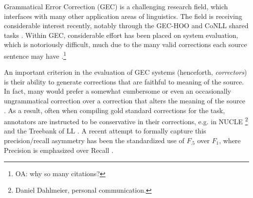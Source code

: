 \documentclass[letter,11pt]{article}
\newcommand{\oa}[1]{\footnote{\color{red}OA: #1}}
\newcommand{\lc}[1]{\footnote{\color{green}LC: #1}}
\begin{document}



Grammatical Error Correction (GEC) is a challenging research field, which interfaces with many
other application areas of linguistics. The field is receiving considerable
interest recently, notably through the GEC-HOO \cite{dale2011helping,dale2012hoo} and
CoNLL shared tasks \cite{kao2013conll,ng2014conll}.
Within GEC, considerable effort has been placed on system evaluation,
which is notoriously difficult,
much due to the many valid corrections each source sentence may have
\cite{tetreault2008native,madnani2011they,chodorow2012problems,dahlmeier2012better}.\oa{why so many citations?}

An important criterion in the evaluation of GEC systems (henceforth, {\it correctors})
is their ability to generate corrections that are faithful to meaning of the source. In fact, many would prefer
a somewhat cumbersome or even an occasionally ungrammatical correction over a correction
that alters the meaning of the source \cite{brockett2006correcting}.
As a result, often when compiling gold standard corrections for the task,
annotators are instructed to be conservative in their corrections, e.g. in NUCLE \footnote{Daniel Dahlmeier, personal communication.} and the Treebank of LL \cite{nicholls2003cambridge}.
A recent attempt to formally capture this precision/recall asymmetry has
been the standardized use of $F_{.5}$ over $F_{1}$, where Precision is
emphasized over Recall \cite{dahlmeier2012better}.
\end{document}
